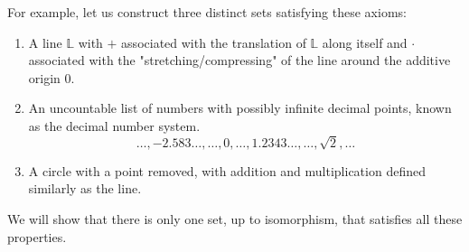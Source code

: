   \begin{example}
    For example, let us construct three distinct sets satisfying these axioms: 
    \begin{enumerate}
      \item A line $\mathbb{L}$ with $+$ associated with the translation of $\mathbb{L}$ along itself and $\cdot$ associated with the "stretching/compressing" of the line around the additive origin $0$. 
      \item An uncountable list of numbers with possibly infinite decimal points, known as the decimal number system. 
      \begin{equation}
        \ldots, -2.583\ldots, \ldots , 0, \ldots, 1.2343\ldots, \ldots, \sqrt{2}, \ldots
      \end{equation}
      \item A circle with a point removed, with addition and multiplication defined similarly as the line. 
    \end{enumerate}
  \end{example}

  We will show that there is only one set, up to isomorphism, that satisfies all these properties. 

